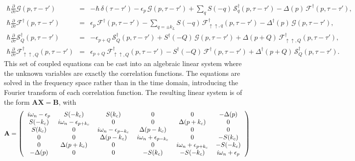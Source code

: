 \documentclass[pra,aps,superscriptaddress,twocolumn]{revtex4}
\begin{document}
\begin{widetext}
\begin{eqnarray}
  \hbar \frac{\partial}{\partial \tau} \mathcal{G}(p,\tau-\tau') & = &
  -\hbar \, \delta(\tau-\tau')-\epsilon_{p}\, \mathcal{G}(p,\tau-\tau') +\sum_{q}S(-q) \, \mathcal{S}^\dagger_q(p,\tau-\tau')-\Delta(p) \, \mathcal{F}^\dagger(p,\tau-\tau'), \\
  \hbar \frac{\partial}{\partial \tau} \mathcal{F}^\dagger(p,\tau-\tau') & = &
  \epsilon_p \, \mathcal{F}^\dagger(p,\tau-\tau') -\sum_{q=\pm k_L}S(-q) \, \mathcal{F}^\dagger_{\uparrow\uparrow, q}(p,\tau-\tau')-\Delta^\dagger(p) \, \mathcal{G}(p,\tau-\tau'), \\
  \hbar \frac{\partial}{\partial \tau} \mathcal{S}_Q^\dagger(p,\tau-\tau') & = &
  -\epsilon_{p+Q} \, \mathcal{S}_Q^\dagger(p,\tau-\tau') +S^\dagger(-Q) \, \mathcal{G}(p,\tau-\tau')+\Delta(p+Q) \, \mathcal{F}^\dagger_{\uparrow\uparrow, Q}(p,\tau-\tau'), \\
  \hbar \frac{\partial}{\partial \tau} \mathcal{F}^\dagger_{\uparrow\uparrow, Q}(p,\tau-\tau') & = &
  \epsilon_{p+Q} \, \mathcal{F}^\dagger_{\uparrow\uparrow, Q}(p,\tau-\tau') -S^\dagger(-Q) \, \mathcal{F}^\dagger(p,\tau-\tau')+\Delta^\dagger(p+Q)\,\mathcal{S}^\dagger_Q(p,\tau-\tau').
\end{eqnarray}
%
This set of coupled equations can be cast into an algebraic linear system where the unknown variables are exactly the correlation functions.
The equations are solved in the frequency space rather than in the time domain, introducing the Fourier transform of each correlation function.
The resulting linear system is of the form $\mathbf{AX}=\mathbf{B}$, with
\begin{equation*}
  \mathbf{A}=
  \begin{pmatrix}
    \begin{tabular}{  c c c c c c }
      $i\omega_n-\epsilon_p$ & $S(-k_c)$ & $S(\small{k_c})$ & 0 & 0 &$-\Delta(p)$ \\
      $S(-k_c)$ & $i\omega_n-\epsilon_{p+k_c}$ & 0 & 0 & $\Delta(p+k_c)$ & 0 \\
      $S(k_c)$ & 0 & $i\omega_n-\epsilon_{p-k_c}$ & $\Delta(p-k_c)$ & 0 & 0 \\
      0 & 0 & $\Delta(p-k_c)$ & $i\omega_n + \epsilon_{p-k_c}$ & 0 & $-S(k_c)$ \\
      0 & $\Delta(p+k_c)$ & 0 & 0 & $i\omega_n + \epsilon_{p+k_c}$ & $-S(-k_c)$ \\
      $-\Delta(p)$ & 0 & 0 & $-S(k_c)$ & $-S(-k_c)$ & $i\omega_n+\epsilon_p$

\end{tabular}
\end{pmatrix}
\end{equation*}
\end{widetext}
\end{document}
